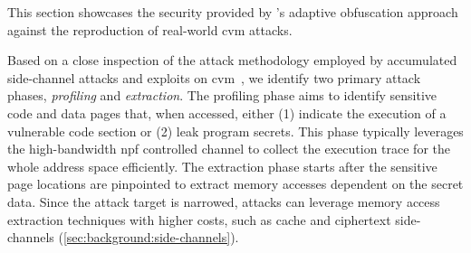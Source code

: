 \iffalse
	This section showcases the security provided by \thename's adaptive obfuscation approach against the reproduction of real-world \gls{cvm} attacks.

	Based on a close inspection of the attack methodology employed by accumulated side-channel attacks and exploits on \gls{cvm}~\cite{}, we identify two primary attack phases, \emph{profiling} and \emph{extraction}.
	The profiling phase aims to identify sensitive code and data pages that, when accessed, either (1) indicate the execution of a vulnerable code section or (2) leak program secrets.
	This phase typically leverages the high-bandwidth \gls{npf} controlled channel to collect the execution trace for the whole address space efficiently.
	The extraction phase starts after the sensitive page locations are pinpointed to extract memory accesses dependent on the secret data.
	Since the attack target is narrowed, attacks can leverage memory access extraction techniques with higher costs, such as cache and ciphertext side-channels (\cref{sec:background:side-channels}).


